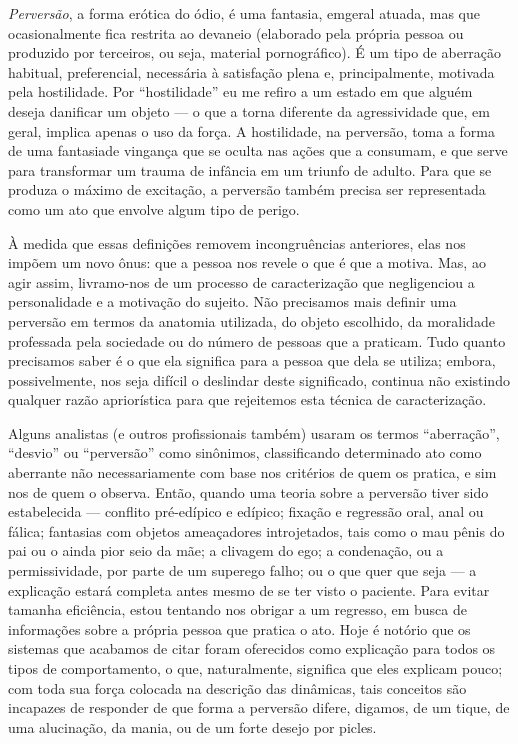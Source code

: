 \textit{Perversão}, a forma erótica do ódio, é uma fantasia, em\idxpsicap[|(]
geral atuada, mas que ocasionalmente fica restrita ao devaneio
(elaborado pela própria pessoa ou produzido por terceiros, ou seja,
material pornográfico). É um tipo de aberração habitual, preferencial,
necessária à satisfação plena e, principalmente, motivada pela
hostilidade.\idxhost{} Por ``hostilidade'' eu me refiro
a um estado em que alguém deseja danificar um objeto --- o que a torna
diferente da agressividade que, em geral, implica apenas o uso da
força.\idxlibid{} A hostilidade, na perversão, toma a forma de uma fantasia\idxfanta[|(] de
vingança\idxvinga{} que se oculta nas ações que a consumam, e que serve para
transformar um trauma\idxtrauma{} de infância\idxinfan{} em um triunfo de adulto. Para que se
produza o máximo de excitação, a perversão também precisa ser
representada como um ato que envolve algum\idxperigo{} tipo\idxfantaexpo{} de perigo.\idxpervexpos{}

À medida que essas definições removem incongruências anteriores,
elas nos impõem um novo ônus: que a pessoa nos revele o que é que a
motiva. Mas, ao agir assim, livramo-nos de um processo de
caracterização que negligenciou a personalidade e a motivação do
sujeito. Não precisamos mais definir uma perversão em termos da
anatomia utilizada, do objeto escolhido, da moralidade professada pela
sociedade ou do número de pessoas que a praticam. Tudo quanto
precisamos saber é o que ela significa para a pessoa que dela se
utiliza; embora, possivelmente, nos seja difícil o deslindar deste
significado, continua não existindo qualquer razão apriorística para
que rejeitemos esta técnica de caracterização.

Alguns analistas (e outros profissionais também) usaram os termos
``aberração'', ``desvio'' ou ``perversão'' como
sinônimos, classificando determinado ato como aberrante não
necessariamente com base nos critérios de quem os pratica, e sim nos de
quem o observa. Então, quando uma teoria sobre a perversão tiver sido
estabelecida --- conflito pré-edípico e edípico;\idxconfe{} fixação e regressão
oral, anal ou fálica; fantasias com objetos ameaçadores introjetados,
tais como o mau pênis do pai ou o ainda pior seio da mãe;\idxmaes{} a clivagem
do ego; a condenação, ou a permissividade, por parte de um superego
falho; ou o que quer que seja --- a explicação estará completa antes
mesmo de se ter visto o paciente. Para evitar tamanha eficiência, estou
tentando nos obrigar a um regresso, em busca de informações sobre a
própria pessoa que pratica o ato. Hoje é notório que os sistemas que
acabamos de citar foram oferecidos como explicação para todos os tipos
de comportamento, o que, naturalmente, significa que eles explicam
pouco; com toda sua força colocada na descrição das dinâmicas, tais
conceitos são incapazes de responder de que forma a perversão difere,
digamos, de um tique, de uma alucinação, da mania, ou de um forte
desejo por picles.

